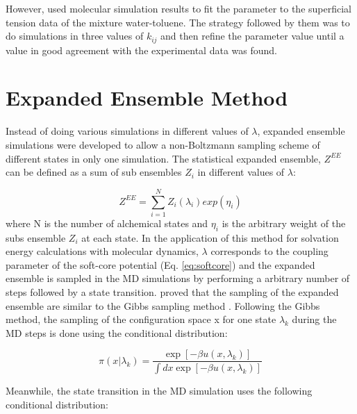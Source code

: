 However,  used molecular simulation results to fit the parameter to the superficial tension data of the mixture water-toluene. The strategy followed by them was to do simulations in three values of $k_{ij}$ and then refine the parameter value until a value in good agreement with the experimental data was found. 



\section{Expanded Ensemble Method}

Instead of doing various simulations in different values of $\lambda$, expanded ensemble simulations \cite{lyubartsev} were developed to allow a non-Boltzmann sampling scheme of different states in only one simulation. The statistical expanded ensemble, $Z^{EE}$ can be defined as a sum of sub ensembles $Z_{i}$ in different values of $\lambda$:

\begin{equation}
Z^{EE} = \sum_{i=1}^{N} Z_{i}(\lambda_{i}) exp(\eta_{i})
\label{eqn:ee}
\end{equation}   
where N is the number of alchemical states and $\eta_{i}$ is the arbitrary weight of the subs ensemble $Z_{i}$ at each state. In the application of this method for solvation energy calculations with molecular dynamics, $\lambda$ corresponds to the coupling parameter of the soft-core potential (Eq. \ref{eq:softcore}) and the expanded ensemble is sampled in the MD simulations by performing a arbitrary number of steps followed by a state transition.  proved that the sampling of the expanded ensemble are similar to the Gibbs sampling method \cite{geman1984,liu2002}. Following the Gibbs method, the sampling of the configuration space x for one state $\lambda_{k}$ during the MD steps is done using the conditional distribution:

\begin{equation}
\pi(x|\lambda_{k}) = \dfrac{\exp[-\beta u(x,\lambda_{k})]}{\int dx \exp [- \beta u(x,\lambda_{k})]}
\label{eqn:rhoee1}
\end{equation} 

Meanwhile, the state transition in the MD simulation uses the following conditional distribution:

